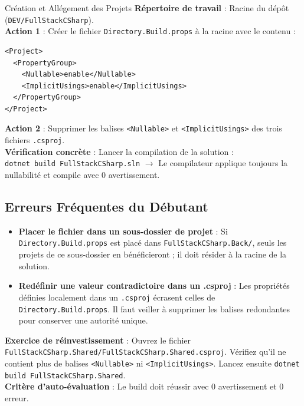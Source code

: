 \documentclass[a4paper,11pt]{report}
\begin{document}
\begin{bestpracticebox}{Création et Allégement des Projets}
\textbf{Répertoire de travail} : Racine du dépôt (\texttt{DEV/FullStackCSharp}).\\[2pt]
\textbf{Action 1} : Créer le fichier \texttt{Directory.Build.props} à la racine avec le contenu :
\begin{verbatim}
<Project>
  <PropertyGroup>
    <Nullable>enable</Nullable>
    <ImplicitUsings>enable</ImplicitUsings>
  </PropertyGroup>
</Project>
\end{verbatim}
\textbf{Action 2} : Supprimer les balises \texttt{<Nullable>} et \texttt{<ImplicitUsings>} des trois fichiers \texttt{.csproj}.\\[2pt]
\textbf{Vérification concrète} : Lancer la compilation de la solution :\\
\texttt{dotnet build FullStackCSharp.sln} $\longrightarrow$ Le compilateur applique toujours la nullabilité et compile avec 0 avertissement.
\end{bestpracticebox}

\vspace{0.2cm}

\subsection*{Erreurs Fréquentes du Débutant}

\begin{itemize}
    \item \textbf{Placer le fichier dans un sous-dossier de projet} : Si \texttt{Directory.Build.props} est placé dans \texttt{FullStackCSharp.Back/}, seuls les projets de ce sous-dossier en bénéficieront ; il doit résider à la racine de la solution.
    \item \textbf{Redéfinir une valeur contradictoire dans un .csproj} : Les propriétés définies localement dans un \texttt{.csproj} écrasent celles de \texttt{Directory.Build.props}. Il faut veiller à supprimer les balises redondantes pour conserver une autorité unique.
\end{itemize}

\vspace{0.2cm}

\begin{tcolorbox}[colback=emerald!4!white,colframe=emerald!40!white,arc=2mm,boxrule=0.8pt,top=2.5mm,bottom=2.5mm,left=3mm,right=3mm]
    \small\textbf{\color{emerald!80!black}Exercice de réinvestissement} :
    Ouvrez le fichier \texttt{FullStackCSharp.Shared/FullStackCSharp.Shared.csproj}. Vérifiez qu'il ne contient plus de balises \texttt{<Nullable>} ni \texttt{<ImplicitUsings>}. Lancez ensuite \texttt{dotnet build FullStackCSharp.Shared}.\\
    \textbf{Critère d'auto-évaluation} : Le build doit réussir avec 0 avertissement et 0 erreur.
\end{tcolorbox}
\end{document}
